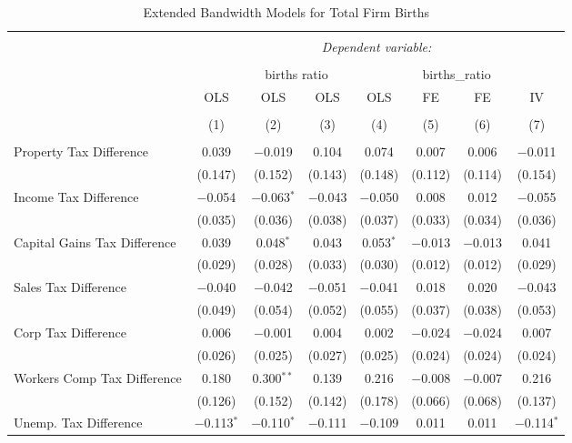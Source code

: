 
\begin{table}[!htbp] \centering 
  \caption{Extended Bandwidth Models for  Total Firm Births} 
  \label{} 
\begin{tabular}{@{\extracolsep{5pt}}lccccccc} 
\\[-1.8ex]\hline 
\hline \\[-1.8ex] 
 & \multicolumn{7}{c}{\textit{Dependent variable:}} \\ 
\cline{2-8} 
\\[-1.8ex] & \multicolumn{4}{c}{births ratio} & \multicolumn{2}{c}{births\_ratio} &   \\ 
 & OLS & OLS & OLS & OLS & FE & FE & IV \\ 
\\[-1.8ex] & (1) & (2) & (3) & (4) & (5) & (6) & (7)\\ 
\hline \\[-1.8ex] 
 Property Tax Difference & 0.039 & $-$0.019 & 0.104 & 0.074 & 0.007 & 0.006 & $-$0.011 \\ 
  & (0.147) & (0.152) & (0.143) & (0.148) & (0.112) & (0.114) & (0.154) \\ 
  Income Tax Difference & $-$0.054 & $-$0.063$^{*}$ & $-$0.043 & $-$0.050 & 0.008 & 0.012 & $-$0.055 \\ 
  & (0.035) & (0.036) & (0.038) & (0.037) & (0.033) & (0.034) & (0.036) \\ 
  Capital Gains Tax Difference & 0.039 & 0.048$^{*}$ & 0.043 & 0.053$^{*}$ & $-$0.013 & $-$0.013 & 0.041 \\ 
  & (0.029) & (0.028) & (0.033) & (0.030) & (0.012) & (0.012) & (0.029) \\ 
  Sales Tax Difference & $-$0.040 & $-$0.042 & $-$0.051 & $-$0.041 & 0.018 & 0.020 & $-$0.043 \\ 
  & (0.049) & (0.054) & (0.052) & (0.055) & (0.037) & (0.038) & (0.053) \\ 
  Corp Tax Difference & 0.006 & $-$0.001 & 0.004 & 0.002 & $-$0.024 & $-$0.024 & 0.007 \\ 
  & (0.026) & (0.025) & (0.027) & (0.025) & (0.024) & (0.024) & (0.024) \\ 
  Workers Comp Tax Difference & 0.180 & 0.300$^{**}$ & 0.139 & 0.216 & $-$0.008 & $-$0.007 & 0.216 \\ 
  & (0.126) & (0.152) & (0.142) & (0.178) & (0.066) & (0.068) & (0.137) \\ 
  Unemp. Tax Difference & $-$0.113$^{*}$ & $-$0.110$^{*}$ & $-$0.111 & $-$0.109 & 0.011 & 0.011 & $-$0.114$^{*}$ \\ 

\end{tabular}
\end{table}
